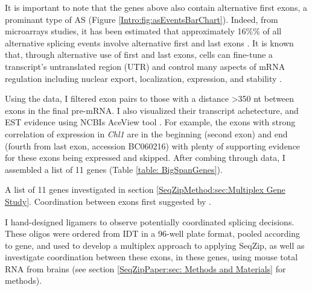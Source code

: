   It is important to note that the genes above also contain alternative first exons, a prominant type of AS (Figure \ref{Intro:fig:asEventsBarChart}). Indeed, from microarrays studies, it has been estimated that approximately 16\%\% of all alternative splicing events involve alternative first and last exons \citep{Bingham2008}. It is known that, through alternative use of first and last exons, cells can fine-tune a transcript's untranslated region (UTR) and control many aspects of mRNA regulation including nuclear export, localization, expression, and stability \citep{Hughes2006}.

  Using the \citet{Fagnani2007} data, I filtered exon pairs to those with a distance >350 nt between exons in the final pre-mRNA. I also visualized their transcript achetecture, and EST evidence using NCBIs AceView tool \citep{Thierry-Mieg2006}. For example, the exons with strong correlation of expression in \textit{Chl1} are in the beginning (second exon) and end (fourth from last exon, accession BC060216) with plenty of supporting evidence for these exons being expressed and skipped. After combing through \citep{Fagnani2007} data, I assembled a list of 11 genes (Table \ref{table: BigSpanGenes}).

  \begin{table} %
    \caption[Mouse genes with large sequence between suggested coordinated cassette exons]
      {
        A list of 11 genes investigated in section \ref{SeqZipMethod:sec:Multiplex Gene Study}. Coordination between exons first suggested by \citep{Fagnani2007}.
        }
    \label{table: BigSpanGenes}
    
    \end{table}

  I hand-designed ligamers to observe potentially coordinated splicing decisions. These oligos were ordered from IDT in a 96-well plate format, pooled according to gene, and used to develop a multiplex approach to applying SeqZip, as well as investigate coordination between these exons, in these genes, using mouse total RNA from brains (see section \ref{SeqZipPaper:sec: Methods and Materials} for methods).

